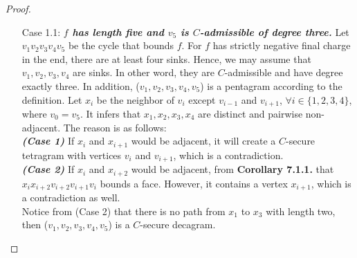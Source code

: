 \begin{proof}
\begin{itemize}
    \item[Case 1.1: ] \textit{\textbf{$f$ has length five and $v_5$ is $C$-admissible of degree three.}} Let $v_1v_2v_3v_4v_5$ be the cycle that bounds $f$. For $f$ has strictly negative final charge in the end, there are at least four sinks. Hence, we may assume that $v_1, v_2, v_3, v_4$ are sinks. In other word, they are $C$-admissible and have degree exactly three. In addition, ($v_1, v_2, v_3, v_4, v_5$) is a pentagram according to the definition. Let $x_i$ be the neighbor of $v_i$ except $v_{i-1}$ and $v_{i+1}$, $\forall i \in \{1, 2, 3, 4\}$, where $v_0 = v_5$. It infers that $x_1, x_2, x_3, x_4$ are distinct and pairwise non-adjacent. The reason is as follows:\\
    \textit{\textbf{(Case 1)}} If $x_i$ and $x_{i+1}$ would be adjacent, it will create a $C$-secure tetragram with vertices $v_i$ and $v_{i+1}$, which is a contradiction.\\
    \textit{\textbf{(Case 2)}} If $x_i$ and $x_{i+2}$ would be adjacent, from \textbf{Corollary 7.1.1.} that $x_ix_{i+2}v_{i+2}v_{i+1}v_{i}$ bounds a face. However, it contains a vertex $x_{i+1}$, which is a contradiction as well.\\
    Notice from (Case 2) that there is no path from $x_1$ to $x_3$ with length two, then ($v_1, v_2, v_3, v_4, v_5$) is a $C$-secure decagram.
    
    
    

\end{itemize}
\end{proof}
